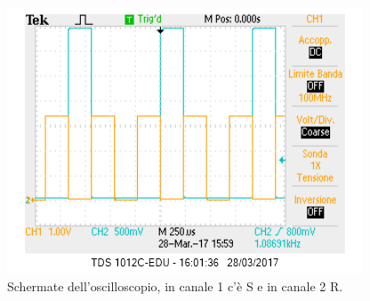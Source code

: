 \documentclass[10pt,a4paper]{article}
\begin{document}
\begin{figure}[!htb]
  \centering
  \includegraphics[scale=0.75]{sommatoreRS.png}
\caption{Schermate dell'oscilloscopio, in canale 1 c'è S e in canale 2 R.\label{osc:sommatore}}
\end{figure}
\end{document}
